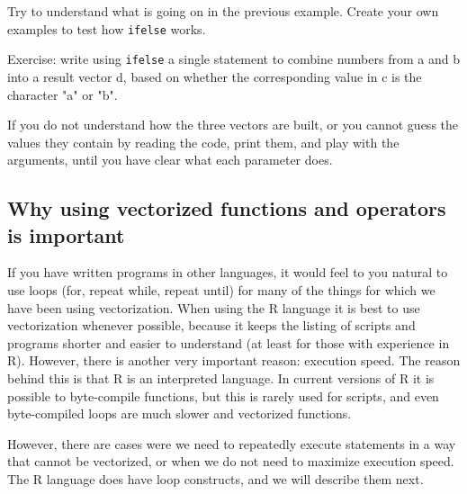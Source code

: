 \documentclass[paper=a4,headsepline,BCOR=12mm,twoside,open=right,%
titlepage,headings=small,fontsize=10pt,index=totoc,bibliography=totoc,%
captions=tableheading,captions=nooneline]{scrbook}\usepackage{knitr}
\begin{document}
Try to understand what is going on in the previous example. Create your own examples to test how \texttt{ifelse} works.

Exercise: write using \texttt{ifelse} a single statement to combine numbers from a and b into a result vector d, based on whether the corresponding value in c is the character "a" or "b".

\begin{knitrout}\footnotesize
{}\color{fgcolor}\begin{kframe}
\begin{alltt}
 \hlkwb{<-} \hlstd{(}\hlopt{-}\hlstd{,} \hlstd{)}
 \hlkwb{<-} \hlstd{(}\hlopt{+}\hlstd{,} \hlstd{)}
 \hlkwb{<-} \hlstd{(}\hlstd{(}\hlstd{,} \hlstd{),} \hlstd{(}\hlstd{,} \hlstd{))}
\end{alltt}
\end{kframe}
\end{knitrout}

If you do not understand how the three vectors are built, or you cannot guess the values they contain by reading the code, print them, and play with the arguments, until you have clear what each parameter does.

\subsection{Why using vectorized functions and operators is important}

If you have written programs in other languages, it would feel to you natural to use loops (for, repeat while, repeat until) for many of the things for which we have been using vectorization. When using the R language it is best to use vectorization whenever possible, because it keeps the listing of scripts and programs shorter and easier to understand (at least for those with experience in R). However, there is another very important reason: execution speed. The reason behind this is that R is an interpreted language. In current versions of R it is possible to byte-compile functions, but this is rarely used for scripts, and even byte-compiled loops are much slower and vectorized functions.

However, there are cases were we need to repeatedly execute statements in a way that cannot be vectorized, or when we do not need to maximize execution speed. The R language does have loop constructs, and we will describe them next.
\end{document}
